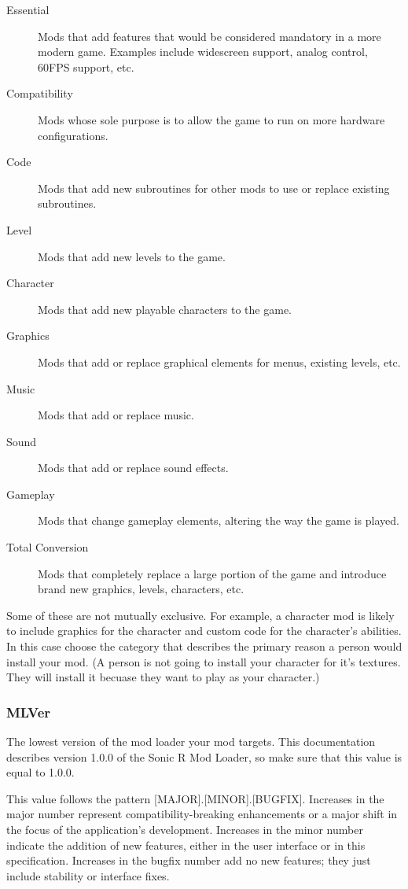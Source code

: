 \documentclass[12pt,a4paper,notitlepage]{article}
\begin{document}
\begin{description}
\item[Essential] Mods that add features that would be considered mandatory in a more modern game. Examples include widescreen support, analog control, 60FPS support, etc. 
\item[Compatibility] Mods whose sole purpose is to allow the game to run on more hardware configurations.
\item[Code] Mods that add new subroutines for other mods to use or replace existing subroutines.
\item[Level] Mods that add new levels to the game.
\item[Character] Mods that add new playable characters to the game.
\item[Graphics] Mods that add or replace graphical elements for menus, existing levels, etc.
\item[Music] Mods that add or replace music.
\item[Sound] Mods that add or replace sound effects.
\item[Gameplay] Mods that change gameplay elements, altering the way the game is played.
\item[Total Conversion] Mods that completely replace a large portion of the game and introduce brand new graphics, levels, characters, etc.

\end{description}
Some of these are not mutually exclusive. For example, a character mod is likely to include graphics for the character and custom code for the character's abilities. In this case choose the category that describes the primary reason a person would install your mod. (A person is not going to install your character for it's textures. They will install it becuase they want to play as your character.)

\subsubsection{MLVer}
\label{subsubsec:create-meta-mlver}
The lowest version of the mod loader your mod targets. This documentation describes version 1.0.0 of the Sonic R Mod Loader, so make sure that this value is equal to 1.0.0.

This value follows the pattern [MAJOR].[MINOR].[BUGFIX]. Increases in the major number represent compatibility-breaking enhancements or a major shift in the focus of the application's development. Increases in the minor number indicate the addition of new features, either in the user interface or in this specification. Increases in the bugfix number add no new features; they just include stability or interface fixes.
\end{document}
